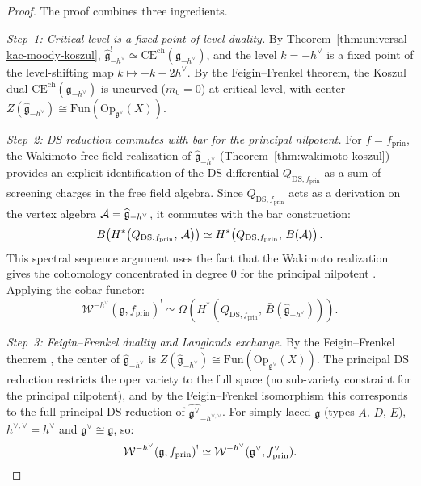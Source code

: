 \begin{proof}
The proof combines three ingredients.

\emph{Step~1: Critical level is a fixed point of level duality.}
By Theorem~\ref{thm:universal-kac-moody-koszul}, $\widehat{\mathfrak{g}}_{-h^\vee}^! \simeq \mathrm{CE}^{\mathrm{ch}}(\mathfrak{g}_{-h^\vee})$, and the level $k = -h^\vee$ is a fixed point of the level-shifting map $k \mapsto -k-2h^\vee$.  By the Feigin--Frenkel theorem, the Koszul dual $\mathrm{CE}^{\mathrm{ch}}(\mathfrak{g}_{-h^\vee})$ is uncurved ($m_0 = 0$) at critical level, with center $Z(\widehat{\mathfrak{g}}_{-h^\vee}) \cong \mathrm{Fun}(\mathrm{Op}_{\mathfrak{g}^\vee}(X))$.

\emph{Step~2: DS reduction commutes with bar for the principal nilpotent.}
For $f = f_{\mathrm{prin}}$, the Wakimoto free field realization of $\widehat{\mathfrak{g}}_{-h^\vee}$ (Theorem~\ref{thm:wakimoto-koszul}) provides an explicit identification of the DS differential $Q_{\mathrm{DS},f_{\mathrm{prin}}}$ as a sum of screening charges in the free field algebra.  Since $Q_{\mathrm{DS},f_{\mathrm{prin}}}$ acts as a derivation on the vertex algebra $\mathcal{A} = \widehat{\mathfrak{g}}_{-h^\vee}$, it commutes with the bar construction:
\[
\bar{B}\!\left(H^*\!\left(Q_{\mathrm{DS},f_{\mathrm{prin}}},\, \mathcal{A}\right)\right)
\simeq H^*\!\left(Q_{\mathrm{DS},f_{\mathrm{prin}}},\, \bar{B}(\mathcal{A})\right).
\]
This spectral sequence argument uses the fact that the Wakimoto realization gives the cohomology concentrated in degree $0$ for the principal nilpotent \cite[Thm.~3.1]{FF}.  Applying the cobar functor:
\[
\mathcal{W}^{-h^\vee}(\mathfrak{g}, f_{\mathrm{prin}})^!
\simeq \Omega\!\left(H^*\!\left(Q_{\mathrm{DS},f_{\mathrm{prin}}},\, \bar{B}(\widehat{\mathfrak{g}}_{-h^\vee})\right)\right).
\]

\emph{Step~3: Feigin--Frenkel duality and Langlands exchange.}
By the Feigin--Frenkel theorem \cite{Feigin-Frenkel}, the center of $\widehat{\mathfrak{g}}_{-h^\vee}$ is $Z(\widehat{\mathfrak{g}}_{-h^\vee}) \cong \mathrm{Fun}(\mathrm{Op}_{\mathfrak{g}^\vee}(X))$.  The principal DS reduction restricts the oper variety to the full space (no sub-variety constraint for the principal nilpotent), and by the Feigin--Frenkel isomorphism this corresponds to the full principal DS reduction of $\widehat{\mathfrak{g}^\vee}_{-h^{\vee,\vee}}$.  For simply-laced $\mathfrak{g}$ (types $A$, $D$, $E$), $h^{\vee,\vee} = h^\vee$ and $\mathfrak{g}^\vee \cong \mathfrak{g}$, so:
\[
\mathcal{W}^{-h^\vee}(\mathfrak{g}, f_{\mathrm{prin}})^! \simeq \mathcal{W}^{-h^\vee}(\mathfrak{g}^\vee, f^\vee_{\mathrm{prin}}). \qedhere
\]
\end{proof}

